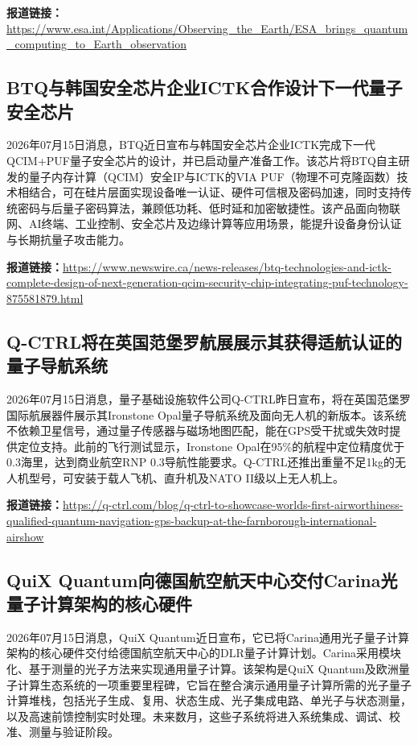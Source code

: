\documentclass[12pt,a4paper]{ctexart}
\begin{document}
\noindent\textbf{报道链接：}\url{https://www.esa.int/Applications/Observing\_the\_Earth/ESA\_brings\_quantum\_computing\_to\_Earth\_observation}

\subsection{ BTQ与韩国安全芯片企业ICTK合作设计下一代量子安全芯片 }

2026年07月15日消息，BTQ近日宣布与韩国安全芯片企业ICTK完成下一代QCIM+PUF量子安全芯片的设计，并已启动量产准备工作。该芯片将BTQ自主研发的量子内存计算（QCIM）安全IP与ICTK的VIA PUF（物理不可克隆函数）技术相结合，可在硅片层面实现设备唯一认证、硬件可信根及密码加速，同时支持传统密码与后量子密码算法，兼顾低功耗、低时延和加密敏捷性。该产品面向物联网、AI终端、工业控制、安全芯片及边缘计算等应用场景，能提升设备身份认证与长期抗量子攻击能力。

\noindent\textbf{报道链接：}\url{https://www.newswire.ca/news-releases/btq-technologies-and-ictk-complete-design-of-next-generation-qcim-security-chip-integrating-puf-technology-875581879.html}

\subsection{ Q-CTRL将在英国范堡罗航展展示其获得适航认证的量子导航系统 }

2026年07月15日消息，量子基础设施软件公司Q-CTRL昨日宣布，将在英国范堡罗国际航展器件展示其Ironstone Opal量子导航系统及面向无人机的新版本。该系统不依赖卫星信号，通过量子传感器与磁场地图匹配，能在GPS受干扰或失效时提供定位支持。此前的飞行测试显示，Ironstone Opal在95\%的航程中定位精度优于0.3海里，达到商业航空RNP 0.3导航性能要求。Q-CTRL还推出重量不足1kg的无人机型号，可安装于载人飞机、直升机及NATO II级以上无人机上。

\noindent\textbf{报道链接：}\url{https://q-ctrl.com/blog/q-ctrl-to-showcase-worlds-first-airworthiness-qualified-quantum-navigation-gps-backup-at-the-farnborough-international-airshow}

\subsection{ QuiX Quantum向德国航空航天中心交付Carina光量子计算架构的核心硬件 }

2026年07月15日消息，QuiX Quantum近日宣布，它已将Carina通用光子量子计算架构的核心硬件交付给德国航空航天中心的DLR量子计算计划。Carina采用模块化、基于测量的光子方法来实现通用量子计算。该架构是QuiX Quantum及欧洲量子计算生态系统的一项重要里程碑，它旨在整合演示通用量子计算所需的光子量子计算堆栈，包括光子生成、复用、状态生成、光子集成电路、单光子与状态测量，以及高速前馈控制实时处理。未来数月，这些子系统将进入系统集成、调试、校准、测量与验证阶段。
\end{document}
